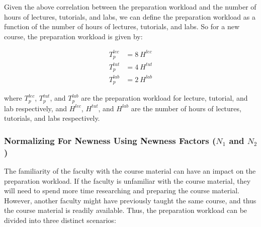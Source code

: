 Given the above correlation between the preparation workload and the number of hours of lectures, tutorials, and labs, we can define the preparation workload as a function of the number of hours of lectures, tutorials, and labs. So for a new course, the preparation workload is given by:

\begin{equation*}
  \label{eqn:preparation-workload}
  \begin{aligned}
    T_p^{lec} & = 8\ H^{lec} \\
    T_p^{tut} & = 4\ H^{tut} \\
    T_p^{lab} & = 2\ H^{lab}
  \end{aligned}
\end{equation*}

where \(T_p^{lec}\), \(T_p^{tut}\), and \(T_p^{lab}\) are the preparation workload for lecture, tutorial, and lab respectively, and \(H^{lec}\), \(H^{tut}\), and \(H^{lab}\) are the number of hours of lectures, tutorials, and labs respectively.

\subsubsection{Normalizing For Newness Using Newness Factors (\(N_1\) and \(N_2\))}

The familiarity of the faculty with the course material can have an impact on the preparation workload. If the faculty is unfamiliar with the course material, they will need to spend more time researching and preparing the course material. However, another faculty might have previously taught the same course, and thus the course material is readily available. Thus, the preparation workload can be divided into three distinct scenarios:

